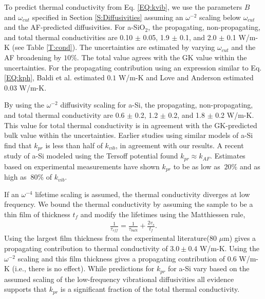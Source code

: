 \documentclass[aps,prb,onecolumn,preprint,superscriptaddress,footinbib,amsmath,amssymb,floatfix]{revtex4}
\begin{document}
To predict thermal conductivity from Eq. \eqref{EQ:kvib}, 
we use the parameters $B$ and $\omega_{cut}$ specified 
in Section \ref{S:Diffusivities} assuming an $\omega^{-2}$ 
scaling below $\omega_{cut}$ and the AF-predicted diffusivities. 
For a-SiO$_2$, the propagating, non-propagating, and total thermal 
conductivities are 0.10 $\pm$ 0.05, 1.9 $\pm$ 0.1, 
and 2.0 $\pm$ 0.1 W/m-K (see Table \ref{T:cond}). The uncertainties 
are estimated by varying $\omega_{cut}$ and the AF 
broadening by $10\%$.  
The total value agrees with the GK value within the uncertainties. 
For the propagating contribution 
using an expression similar to Eq. \eqref{EQ:kph}, 
Baldi et al. estimated $0.1$ W/m-K 
\cite{baldi_thermal_2008} and Love and Anderson estimated 0.03 
W/m-K.\cite{love_estimate_1990}

By using the $\omega^{-2}$ diffusivity scaling for a-Si, 
the propagating, non-propagating, and total thermal conductivity 
are 0.6 $\pm$ 0.2, 1.2 $\pm$ 0.2, and 1.8 $\pm$ 0.2 W/m-K. 
This value for total thermal conductivity 
is in agreement with the GK-predicted bulk value within the 
uncertainties. Earlier studies using 
similar models of a-Si find 
that $k_{pr}$ is less than half of 
$k_{vib}$,\cite{feldman_thermal_1993,
feldman_numerical_1999} in agreement with our results.  
A recent study of a-Si modeled using the Tersoff potential found 
$k_{pr} \approx k_{AF}$.\cite{he_heat_2011} 
Estimates based on experimental measurements 
have shown $k_{pr}$ to be as low as 
$~20\%$\cite{cahill_thermal_1994,feldman_numerical_1999} 
and as high as $~80\%$ of $k_{vib}$.
\cite{liu_high_2009,yang_anomalously_2010}

If an $\omega^{-4}$ lifetime scaling is assumed, 
the thermal conductivity diverges at low frequency. We bound the 
thermal conductivity by assuming the sample to be a thin film 
of thickness $t_f$ and modify the lifetimes using the Matthiessen 
rule,\cite{sellan_cross-plane_2010} 
\begin{equation}\label{EQ:LambdaMatth}
\begin{split}
\frac{1}{\tau_{eff}} = \frac{1}{\tau_{bulk}} + 
\frac{2v_s}{t_f}.
\end{split}
\end{equation}
Using the largest film thickness from the experimental 
literature($80$ $\mu$m)\cite{liu_high_2009} 
gives a propagating contribution 
to thermal conductivity of $3.0 \pm 0.4$ W/m-K. 
Using the $\omega^{-2}$ scaling and this film thickness 
gives a propagating contribution of 0.6 W/m-K (i.e., there is 
no effect). 
While predictions for $k_{pr}$ for a-Si  
vary based on the assumed scaling of the low-frequency 
vibrational diffusivities
\cite{feldman_thermal_1993,cahill_thermal_1994,
feldman_numerical_1999,liu_high_2009,yang_anomalously_2010,
he_heat_2011} 
all evidence supports that $k_{pr}$ is a significant fraction 
of the total thermal conductivity.
\cite{feldman_thermal_1993,cahill_thermal_1994,
feldman_numerical_1999,liu_high_2009,
yang_anomalously_2010,
he_heat_2011,regner_broadband_2013}
\end{document}
